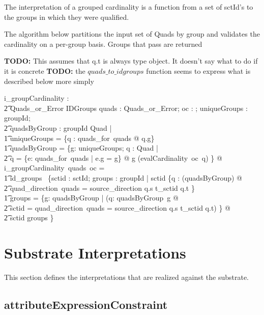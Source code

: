 \documentclass{article}
\begin{document}
The interpretation of a grouped cardinality is a function from a set of sctId's to the groups in which they were qualified.

The algorithm below partitions the input set of Quads by group and validates the cardinality on a per-group basis.  Groups that
pass are returned

\textbf{TODO:} This assumes that q.t is always type object. It doesn't say what to do if it is concrete
\textbf{TODO:} the $quads\_to\_idgroups$ function seems to express what is described below more simply
\begin{gendef}
   i\_groupCardinality : \\
\t2 Quads\_or\_Error \fun \optional[cardinality] \fun IDGroups
\where
   \forall quads : Quads\_or\_Error; oc : \optional[cardinality]; uniqueGroups : \power groupId; \\
\t2 quadsByGroup : groupId \pfun \power Quad |  \\
\t1    uniqueGroups = \{q : quads\_for~quads @ q.g\}  \land \\
\t1    quadsByGroup = \{g: uniqueGroups; q : \power Quad | \\
\t2 q = \{e: quads\_for~quads | e.g = g\}  @ g \mapsto (evalCardinality~oc~q) \} @ \\
i\_groupCardinality~quads~oc = \\
\t1 id\_groups~ \{sctid : sctId; groups : \power groupId | sctid \in \{q : \bigcup (\ran quadsByGroup) @ \\
\t2  \IF quad\_direction~quads = source\_direction \THEN q.s \ELSE t\_sctid \inv q.t \} \land \\
\t1 groups = \{g: \dom quadsByGroup | (\exists q: quadsByGroup~g @ \\
\t2 sctid = \IF quad\_direction~quads = source\_direction \THEN q.s \ELSE t\_sctid \inv q.t) \} @ \\
\t2 sctid \mapsto groups \}
\end{gendef}





\section{Substrate Interpretations}
\label{sect:substrate}
This section defines the interpretations that are realized against the substrate. 

\subsection{attributeExpressionConstraint}
\end{document}
